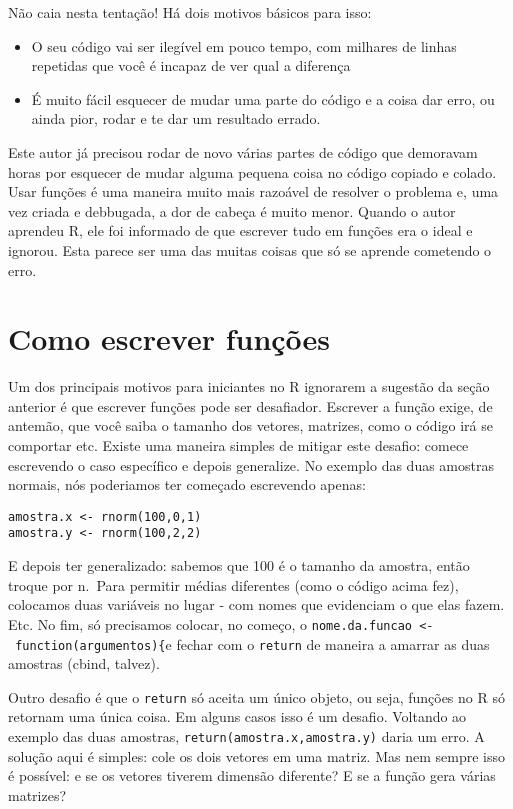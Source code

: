 \documentclass[
]{book}
\providecommand{\tightlist}{%
  \setlength{\itemsep}{0pt}\setlength{\parskip}{0pt}}
\begin{document}
Não caia nesta tentação! Há dois motivos básicos para isso:

\begin{itemize}
\tightlist
\item
  O seu código vai ser ilegível em pouco tempo, com milhares de linhas repetidas que você é incapaz de ver qual a diferença
\item
  É muito fácil esquecer de mudar uma parte do código e a coisa dar erro, ou ainda pior, rodar e te dar um resultado errado.
\end{itemize}

Este autor já precisou rodar de novo várias partes de código que demoravam horas por esquecer de mudar alguma pequena coisa no código copiado e colado. Usar funções é uma maneira muito mais razoável de resolver o problema e, uma vez criada e debbugada, a dor de cabeça é muito menor. Quando o autor aprendeu R, ele foi informado de que escrever tudo em funções era o ideal e ignorou. Esta parece ser uma das muitas coisas que só se aprende cometendo o erro.

\hypertarget{como-escrever-funuxe7uxf5es}{%
\section{Como escrever funções}\label{como-escrever-funuxe7uxf5es}}

Um dos principais motivos para iniciantes no R ignorarem a sugestão da seção anterior é que escrever funções pode ser desafiador. Escrever a função exige, de antemão, que você saiba o tamanho dos vetores, matrizes, como o código irá se comportar etc. Existe uma maneira simples de mitigar este desafio: comece escrevendo o caso específico e depois generalize. No exemplo das duas amostras normais, nós poderiamos ter começado escrevendo apenas:

\begin{verbatim}
amostra.x <- rnorm(100,0,1)
amostra.y <- rnorm(100,2,2)
\end{verbatim}

E depois ter generalizado: sabemos que 100 é o tamanho da amostra, então troque por n.~Para permitir médias diferentes (como o código acima fez), colocamos duas variáveis no lugar - com nomes que evidenciam o que elas fazem. Etc. No fim, só precisamos colocar, no começo, o \texttt{nome.da.funcao\ \textless{}-\ function(argumentos)\{}e fechar com o \texttt{return} de maneira a amarrar as duas amostras (cbind, talvez).

Outro desafio é que o \texttt{return} só aceita um único objeto, ou seja, funções no R só retornam uma única coisa. Em alguns casos isso é um desafio. Voltando ao exemplo das duas amostras, \texttt{return(amostra.x,amostra.y)} daria um erro. A solução aqui é simples: cole os dois vetores em uma matriz. Mas nem sempre isso é possível: e se os vetores tiverem dimensão diferente? E se a função gera várias matrizes?
\end{document}

